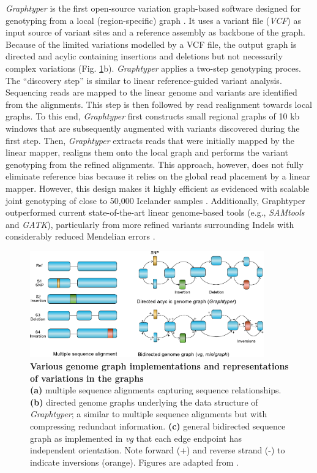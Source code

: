 \documentclass[../main.tex]{subfiles}
\begin{document}
\emph{Graphtyper }is the first open-source variation graph-based software designed for genotyping from a local (region-specific) graph \citep{eggertsson2017graphtyper,eggertsson2019graphtyper2}. It uses a variant file (\emph{VCF}) as input source of variant sites and a reference assembly as backbone of the graph. Because of the limited variations modelled by a VCF file, the output graph is directed and acylic containing insertions and deletions but not necessarily complex variations (Fig. \ref{fig15:mut}b). \emph{Graphtyper} applies a two-step genotyping proces. The  “discovery step” is similar to linear reference-guided variant analysis. Sequencing reads are mapped to the linear genome and variants are identified from the alignments. This step is then followed by read realignment towards local graphs. To this end, \emph{Graphtyper} first constructs small regional graphs of 10 kb windows that are subsequently augmented with variants discovered during the first step. Then, \emph{Graphtyper} extracts reads that were initially mapped by the linear mapper, realigns them onto the local graph and performs the variant genotyping from the refined alignments. This approach, however, does not  fully  eliminate reference bias because it relies on the global read placement by a linear mapper. However, this design makes it highly efficient as evidenced with scalable joint genotyping of close to 50,000 Icelander samples \citep{eggertsson2019graphtyper2}. Additionally, Graphtyper outperformed current state-of-the-art linear genome-based tools (e.g., \emph{SAMtools} and \emph{GATK}), particularly from more refined variants surrounding Indels with considerably reduced Mendelian errors \citep{eggertsson2017graphtyper}.

\begin{figure}[!htb]
    \centering
    \includegraphics[width=0.9\textwidth]{intro/fig5.pdf}
        \vspace{3mm}
        \caption[Genetic variant representation in the genome graphs]{\textbf{Various genome graph implementations and representations of variations in the graphs} \\
        \footnotesize{\textbf{(a)} multiple sequence alignments capturing sequence relationships. \textbf{(b)} directed genome graphs underlying the data structure of \emph{Graphtyper}; a similar to multiple sequence alignments but with compressing redundant information. \textbf{(c)} general bidirected sequence graph as implemented in \emph{vg} that each edge endpoint has independent orientation. Note  forward (+) and reverse strand (-) to indicate inversions (orange). Figures are adapted from \citep{eizenga2020pangenome}.}}
        \label{fig15:mut}
\end{figure}
\end{document}
